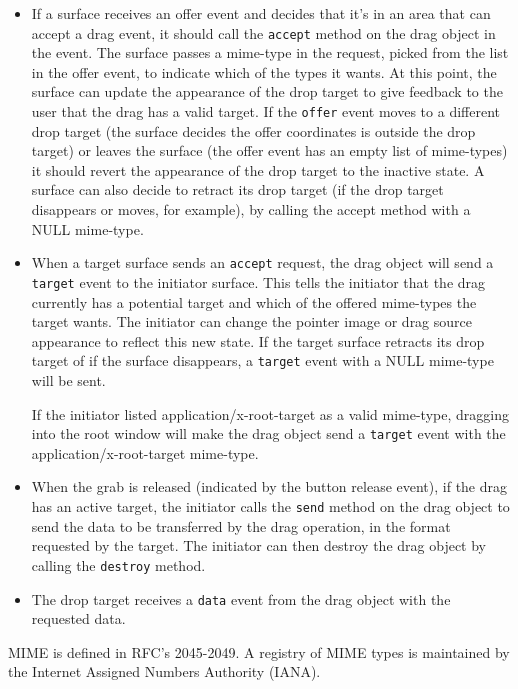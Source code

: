 \documentclass{article}
\begin{document}
\begin{itemize}
\item If a surface receives an offer event and decides that it's in an
  area that can accept a drag event, it should call the
  \texttt{accept} method on the drag object in the event.  The surface
  passes a mime-type in the request, picked from the list in the offer
  event, to indicate which of the types it wants.  At this point, the
  surface can update the appearance of the drop target to give
  feedback to the user that the drag has a valid target.  If the
  \texttt{offer} event moves to a different drop target (the surface
  decides the offer coordinates is outside the drop target) or leaves
  the surface (the offer event has an empty list of mime-types) it
  should revert the appearance of the drop target to the inactive
  state.  A surface can also decide to retract its drop target (if the
  drop target disappears or moves, for example), by calling the accept
  method with a NULL mime-type.

\item When a target surface sends an \texttt{accept} request, the drag
  object will send a \texttt{target} event to the initiator surface.
  This tells the initiator that the drag currently has a potential
  target and which of the offered mime-types the target wants.  The
  initiator can change the pointer image or drag source appearance to
  reflect this new state.  If the target surface retracts its drop
  target of if the surface disappears, a \texttt{target} event with a
  NULL mime-type will be sent.

  If the initiator listed application/x-root-target as a valid
  mime-type, dragging into the root window will make the drag object
  send a \texttt{target} event with the application/x-root-target
  mime-type.

\item When the grab is released (indicated by the button release
  event), if the drag has an active target, the initiator calls the
  \texttt{send} method on the drag object to send the data to be
  transferred by the drag operation, in the format requested by the
  target.  The initiator can then destroy the drag object by calling
  the \texttt{destroy} method.

\item The drop target receives a \texttt{data} event from the drag
  object with the requested data.
\end{itemize}

MIME is defined in RFC's 2045-2049. A registry of MIME types is
maintained by the Internet Assigned Numbers Authority (IANA).
\end{document}
